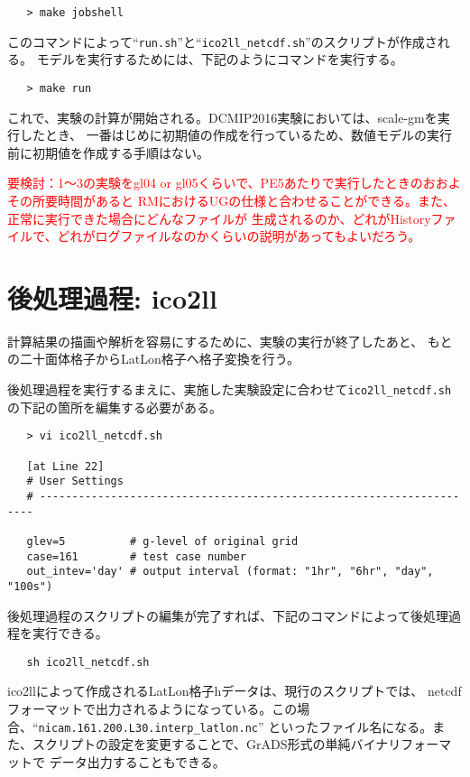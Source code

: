  \begin{verbatim}
   > make jobshell
 \end{verbatim}

このコマンドによって``\verb|run.sh|''と``\verb|ico2ll_netcdf.sh|''のスクリプトが作成される。
モデルを実行するためには、下記のようにコマンドを実行する。

 \begin{verbatim}
   > make run
 \end{verbatim}

これで、実験の計算が開始される。DCMIP2016実験においては、scale-gmを実行したとき、
一番はじめに初期値の作成を行っているため、数値モデルの実行前に初期値を作成する手順はない。

\textcolor{red}{要検討：1〜3の実験をgl04 or gl05くらいで、PE5あたりで実行したときのおおよその所要時間があると
 RMにおけるUGの仕様と合わせることができる。また、正常に実行できた場合にどんなファイルが
 生成されるのか、どれがHistoryファイルで、どれがログファイルなのかくらいの説明があってもよいだろう。}


\section{後処理過程: ico2ll}
計算結果の描画や解析を容易にするために、実験の実行が終了したあと、
もとの二十面体格子からLatLon格子へ格子変換を行う。

後処理過程を実行するまえに、実施した実験設定に合わせて\verb|ico2ll_netcdf.sh|
の下記の箇所を編集する必要がある。
 \begin{verbatim}
   > vi ico2ll_netcdf.sh

   [at Line 22]
   # User Settings
   # ---------------------------------------------------------------------

   glev=5          # g-level of original grid
   case=161        # test case number
   out_intev='day' # output interval (format: "1hr", "6hr", "day", "100s")
 \end{verbatim}

 \noindent 後処理過程のスクリプトの編集が完了すれば、下記のコマンドによって後処理過程を実行できる。
 \begin{verbatim}
   sh ico2ll_netcdf.sh
 \end{verbatim}


 \noindent ico2llによって作成されるLatLon格子hデータは、現行のスクリプトでは、
netcdfフォーマットで出力されるようになっている。この場合、``\verb|nicam.161.200.L30.interp_latlon.nc|''
といったファイル名になる。また、スクリプトの設定を変更することで、GrADS形式の単純バイナリフォーマットで
データ出力することもできる。

